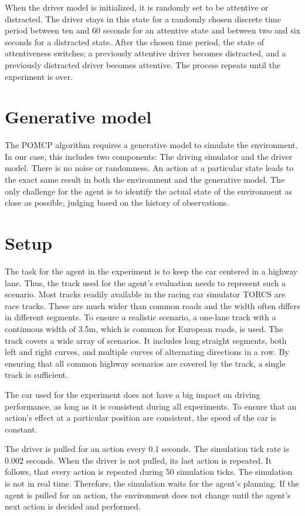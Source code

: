 When the driver model is initialized, it is randomly set to be attentive or distracted. The driver stays in this state for a randomly chosen discrete time period between ten and 60 seconds for an attentive state and between two and six seconds for a distracted state. After the chosen time period, the state of attentiveness switches; a previously attentive driver becomes distracted, and a previously distracted driver becomes attentive. The process repeats until the experiment is over.

\section*{Generative model}

The POMCP algorithm requires a generative model to simulate the environment. In our case, this includes two components: The driving simulator and the driver model. There is no noise or randomness. An action at a particular state leads to the exact same result in both the environment and the generative model. The only challenge for the agent is to identify the actual state of the environment as close as possible, judging based on the history of observations.

\section*{Setup}

The task for the agent in the experiment is to keep the car centered in a highway lane. Thus, the track used for the agent's evaluation needs to represent such a scenario. Most tracks readily available in the racing car simulator TORCS are race tracks. These are much wider than common roads and the width often differs in different segments. To ensure a realistic scenario, a one-lane track with a continuous width of 3.5m, which is common for European roads, is used. The track covers a wide array of scenarios. It includes long straight segments, both left and right curves, and multiple curves of alternating directions in a row. By ensuring that all common highway scenarios are covered by the track, a single track is sufficient.

The car used for the experiment does not have a big impact on driving performance, as long as it is consistent during all experiments. To ensure that an action's effect at a particular position are consistent, the speed of the car is constant.

The driver is pulled for an action every 0.1 seconds. The simulation tick rate is 0.002 seconds. When the driver is not pulled, its last action is repeated. It follows, that every action is repeated during 50 simulation ticks. The simulation is not in real time. Therefore, the simulation waits for the agent's planning. If the agent is pulled for an action, the environment does not change until the agent's next action is decided and performed.

